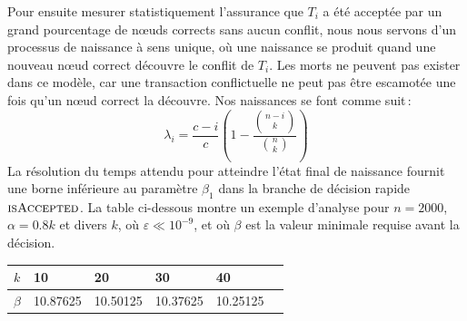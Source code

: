 \documentclass[letterpaper,twocolumn,10pt]{article}
\theoremstyle{definition}
\begin{document}
\begin{appendices}
Pour ensuite mesurer statistiquement l'assurance que $T_i$ a été acceptée par un grand pourcentage de nœuds corrects sans aucun conflit, nous nous servons d'un processus de naissance à sens unique, où une naissance se produit quand une nouveau nœud correct découvre le conflit de $T_i$. Les morts ne peuvent pas exister dans ce modèle, car une transaction conflictuelle ne peut pas être escamotée une fois qu'un nœud correct la découvre.
Nos naissances se font comme suit\,:
\begin{equation}
    \lambda_i = \frac{c - i}{c} \left(1 - \frac{{n - i \choose k}}{{n \choose k}}\right)
\end{equation}
La résolution du temps attendu pour atteindre l'état final de naissance fournit une borne inférieure au paramètre $\beta_1$ dans la branche de décision rapide $\textsc{isAccepted}$. La table ci-dessous montre un exemple d'analyse pour $n = 2000$, $\alpha = 0.8k$ et divers $k$, où $\varepsilon \ll 10^{-9}$, et où $\beta$ est la valeur minimale requise avant la décision.
\begin{table}[h!]
    \small
	\centering
	\begin{tabular}{llllll}
		$k$   & 10 & 20 & 30 & 40 \\ \hline
		$\beta$ & 10.87625 & 10.50125 & 10.37625 & 10.25125
	\end{tabular}
	\label{table:fast-path-beta}
\end{table}


\end{appendices}
\end{document}
